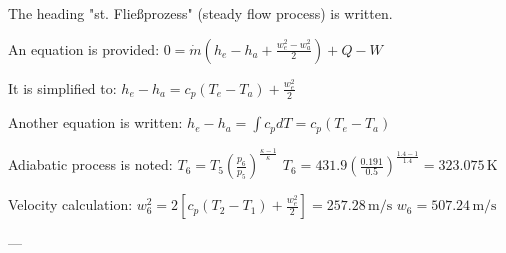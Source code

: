 The heading "st. Fließprozess" (steady flow process) is written.  

An equation is provided:  
\( 0 = \dot{m} (h_e - h_a + \frac{w_e^2 - w_a^2}{2}) + Q - W \)  

It is simplified to:  
\( h_e - h_a = c_p (T_e - T_a) + \frac{w_e^2}{2} \)  

Another equation is written:  
\( h_e - h_a = \int c_p dT = c_p (T_e - T_a) \)  

Adiabatic process is noted:  
\( T_6 = T_5 (\frac{p_6}{p_5})^{\frac{\kappa - 1}{\kappa}} \)  
\( T_6 = 431.9 (\frac{0.191}{0.5})^{\frac{1.4 - 1}{1.4}} = 323.075 \, \text{K} \)  

Velocity calculation:  
\( w_6^2 = 2 [c_p (T_2 - T_1) + \frac{w_e^2}{2}] = 257.28 \, \text{m/s} \)  
\( w_6 = 507.24 \, \text{m/s} \)  

---